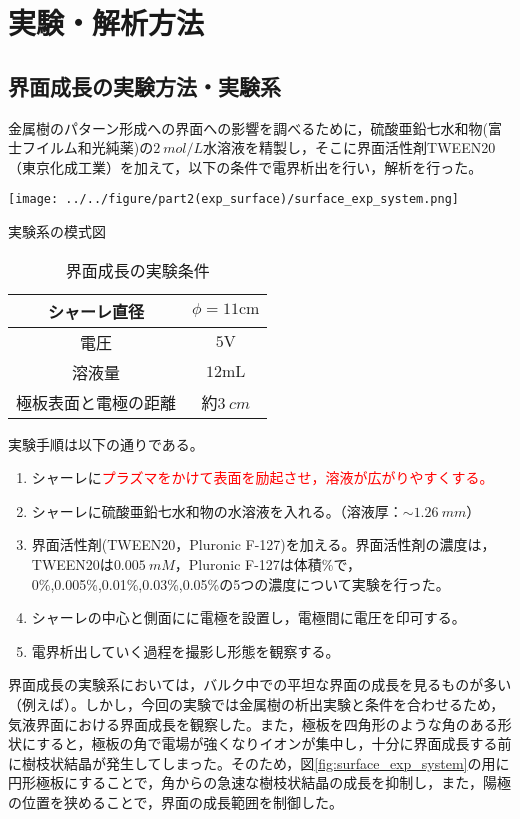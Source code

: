 \documentclass[autodetect-engine,dvi=dvipdfmx,a4paper,ja=standard,oneside,openany,11pt,draft]{bxjsbook}
\begin{document}
\section{実験・解析方法}
\subsection{界面成長の実験方法・実験系}
金属樹のパターン形成への界面への影響を調べるために，硫酸亜鉛七水和物(富士フイルム和光純薬)の$\SI{2}{mol/L}$水溶液を精製し，そこに界面活性剤TWEEN20（東京化成工業）を加えて，以下の条件で電界析出を行い，解析を行った。
\begin{table}[H]
  \begin{minipage}{0.5\hsize}
    \centering
    \texttt{[image: ../../figure/part2(exp\_surface)/surface\_exp\_system.png]}
    \caption{実験系の模式図}
    \label{fig:surface_exp_system}
  \end{minipage}
  \begin{minipage}{0.5\hsize}
    \centering
    \caption{界面成長の実験条件}
    \begin{tabular}{c||c}
      \hline
      シャーレ直径     & $\phi = 11 \si{\cm}$ \\ \hline
      電圧         & $5 \si{\V}$          \\ \hline
      溶液量        & $12 \si{\mL}$        \\
      極板表面と電極の距離 & 約$\SI{3}{cm}$        \\
      \hline
    \end{tabular}
    \label{tab:surface_exp_condition}
  \end{minipage}
  \label{fig:surface_exp_system_condition}
\end{table}
実験手順は以下の通りである。
\begin{enumerate}
  \item シャーレに\textcolor{red}{プラズマをかけて表面を励起させ，溶液が広がりやすくする。}
  \item シャーレに硫酸亜鉛七水和物の水溶液を入れる。（溶液厚：$\sim\SI{1.26}{mm}$）
  \item 界面活性剤(TWEEN20，Pluronic F-127)を加える。界面活性剤の濃度は，TWEEN20は$\SI{0.005}{mM}$，Pluronic F-127は体積\%で，0\%,0.005\%,0.01\%,0.03\%,0.05\%の5つの濃度について実験を行った。
  \item シャーレの中心と側面にに電極を設置し，電極間に電圧を印可する。
  \item 電界析出していく過程を撮影し形態を観察する。
\end{enumerate}
界面成長の実験系においては，バルク中での平坦な界面の成長を見るものが多い（例えば\cite{schilardi1998evolution}）。しかし，今回の実験では金属樹の析出実験と条件を合わせるため，気液界面における界面成長を観察した。また，極板を四角形のような角のある形状にすると，極板の角で電場が強くなりイオンが集中し，十分に界面成長する前に樹枝状結晶が発生してしまった。そのため，図\ref{fig:surface_exp_system}の用に円形極板にすることで，角からの急速な樹枝状結晶の成長を抑制し，また，陽極の位置を狭めることで，界面の成長範囲を制御した。
\end{document}
